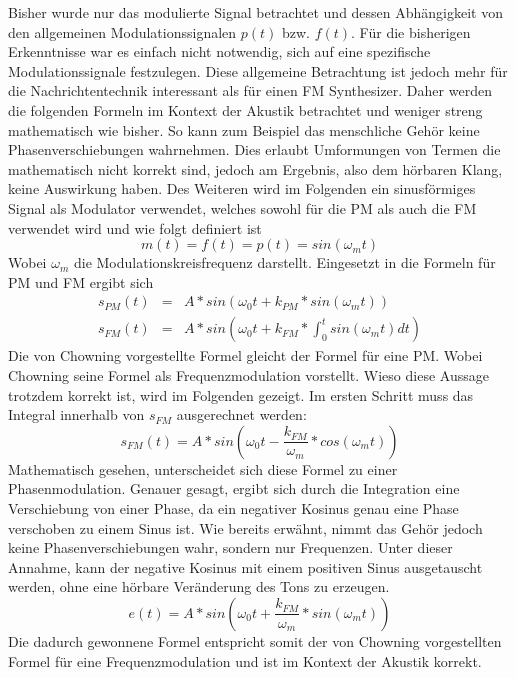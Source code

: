 Bisher wurde nur das modulierte Signal betrachtet und dessen Abhängigkeit von den allgemeinen Modulationssignalen \(p(t)\) bzw. \(f(t)\). Für die bisherigen Erkenntnisse war es einfach nicht notwendig, sich auf eine spezifische Modulationssignale festzulegen. Diese allgemeine Betrachtung ist jedoch mehr für die Nachrichtentechnik interessant als für einen FM Synthesizer.
Daher werden die folgenden Formeln im Kontext der Akustik betrachtet und weniger streng mathematisch wie bisher. So kann zum Beispiel das menschliche Gehör keine Phasenverschiebungen wahrnehmen. Dies erlaubt Umformungen von Termen die mathematisch nicht korrekt sind, jedoch am Ergebnis, also dem hörbaren Klang, keine Auswirkung haben. Des Weiteren wird im Folgenden ein sinusförmiges Signal als Modulator verwendet, welches sowohl für die PM als auch die FM verwendet wird und wie folgt definiert ist
\begin{equation}
m(t)=f(t)=p(t)=sin(\omega_m t)
\end{equation}
Wobei \(\omega_m\) die Modulationskreisfrequenz darstellt. Eingesetzt in die Formeln für PM und FM ergibt sich
\begin{eqnarray*}
s_{PM}(t)&=&A*sin(\omega_0t+k_{PM}*sin(\omega_m t)) \\
s_{FM}(t)&=&A*sin(\omega_0t+k_{FM}*\int_0^t{sin(\omega_m t)} dt)
\end{eqnarray*}
Die von Chowning vorgestellte Formel gleicht der Formel für eine PM. \cite{chowningPaper} Wobei Chowning seine Formel als Frequenzmodulation vorstellt. Wieso diese Aussage trotzdem korrekt ist, wird im Folgenden gezeigt. Im ersten Schritt muss das Integral innerhalb von \(s_{FM}\) ausgerechnet werden:
\begin{equation*}
s_{FM}(t)=A*sin(\omega_0t-\frac{k_{FM}}{\omega_m}*cos(\omega_m t))
\end{equation*}
Mathematisch gesehen, unterscheidet sich diese Formel zu einer Phasenmodulation. Genauer gesagt, ergibt sich durch die Integration eine Verschiebung von einer Phase, da ein negativer Kosinus genau eine Phase verschoben zu einem Sinus ist. Wie bereits erwähnt, nimmt das Gehör jedoch keine Phasenverschiebungen wahr, sondern nur Frequenzen. Unter dieser Annahme, kann der negative Kosinus mit einem positiven Sinus ausgetauscht werden, ohne eine hörbare Veränderung des Tons zu erzeugen.
\begin{equation*}
e(t)=A*sin(\omega_0t+\frac{k_{FM}}{\omega_m}*sin(\omega_m t))
\end{equation*}
Die dadurch gewonnene Formel entspricht somit der von Chowning vorgestellten Formel für eine Frequenzmodulation und ist im Kontext der Akustik korrekt.


